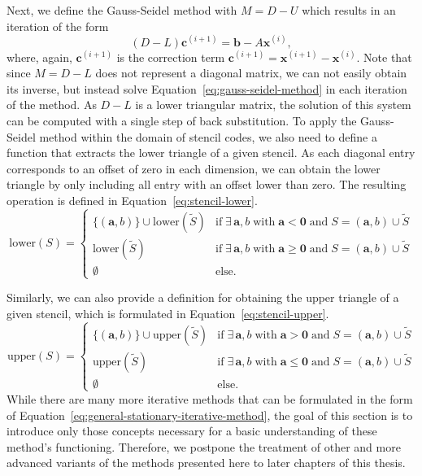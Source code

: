 Next, we define the Gauss-Seidel method with $M = D - U$ which results in an iteration of the form
\begin{equation}
	(D - L) \bm{c}^{(i+1)} = \bm{b} - A \bm{x}^{(i)}, 
	\label{eq:gauss-seidel-method}
\end{equation}
where, again, $\bm{c}^{(i+1)}$ is the correction term $\bm{c}^{(i+1)} = \bm{x}^{(i+1)} - \bm{x}^{(i)}$.
Note that since $M = D - L$ does not represent a diagonal matrix, we can not easily obtain its inverse, but instead solve Equation~\eqref{eq:gauss-seidel-method} in each iteration of the method.
As $D - L$ is a lower triangular matrix, the solution of this system can be computed with a single step of back substitution. 
To apply the Gauss-Seidel method within the domain of stencil codes, we also need to define a function that extracts the lower triangle of a given stencil.
As each diagonal entry corresponds to an offset of zero in each dimension, we can obtain the lower triangle by only including all entry with an offset lower than zero.
The resulting operation is defined in Equation~\eqref{eq:stencil-lower}.
\begin{equation}
	\text{lower}(S) = \begin{cases}
		\{(\bm{a}, b) \} \cup \text{lower}(\tilde{S}) & \text{if} \; \exists\, \bm a, b \; \text{with} \; \bm a < \bm 0 \; \text{and} \; S = (\bm a, b) \cup \tilde{S} \\
		\text{lower}(\tilde{S}) & \text{if} \; \exists\, \bm a, b \; \text{with} \; \bm a \geq \bm 0 \; \text{and} \; S = (\bm a, b) \cup \tilde{S} \\
		\emptyset & \text{else}.
	\end{cases}
	\label{eq:stencil-lower}
\end{equation}

Similarly, we can also provide a definition for obtaining the upper triangle of a given stencil, which is formulated in Equation~\eqref{eq:stencil-upper}.
\begin{equation}
	\text{upper}(S) = \begin{cases}
		\{(\bm{a}, b) \} \cup \text{upper}(\tilde{S}) & \text{if} \; \exists\, \bm a, b \; \text{with} \; \bm a > \bm 0 \; \text{and} \; S = (\bm a, b) \cup \tilde{S} \\
		\text{upper}(\tilde{S}) & \text{if} \; \exists\, \bm a, b \; \text{with} \; \bm a \leq \bm 0 \; \text{and} \; S = (\bm a, b) \cup \tilde{S} \\
		\emptyset & \text{else}.
	\end{cases}
	\label{eq:stencil-upper}
\end{equation}
While there are many more iterative methods that can be formulated in the form of Equation~\eqref{eq:general-stationary-iterative-method}, the goal of this section is to introduce only those concepts necessary for a basic understanding of these method's functioning.
Therefore, we postpone the treatment of other and more advanced variants of the methods presented here to later chapters of this thesis. 

